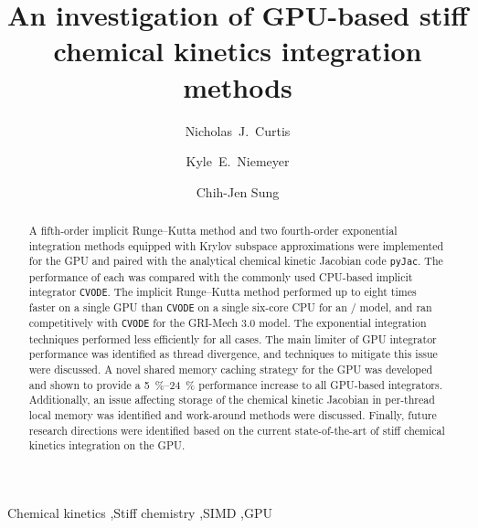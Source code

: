 \documentclass[preprint]{elsarticle}
\begin{document}
\begin{frontmatter}

\title{An investigation of GPU-based stiff chemical kinetics integration methods}

\author[uconn]{Nicholas~J.\ Curtis}
\author[osu]{Kyle~E.\ Niemeyer}
\author[uconn]{Chih-Jen Sung}

\address[uconn]{Department of Mechanical Engineering\\
  University of Connecticut, Storrs, CT, 06269, USA}
\address[osu]{School of Mechanical, Industrial, and Manufacturing Engineering\\
  Oregon State University, Corvallis, OR 97331, USA}
  

\begin{abstract}
A fifth-order implicit Runge--Kutta method and two fourth-order exponential integration methods equipped with Krylov subspace approximations were implemented for the GPU and paired with the analytical chemical kinetic Jacobian code \texttt{pyJac}.
The performance of each was compared with the commonly used CPU-based implicit integrator \texttt{CVODE}.
The implicit Runge--Kutta method performed up to eight times faster on a single GPU than \texttt{CVODE} on a single six-core CPU for an \slash {} model, and ran competitively with \texttt{CVODE} for the GRI-Mech 3.0 model.
The exponential integration techniques performed less efficiently for all cases.
The main limiter of GPU integrator performance was identified as thread divergence, and techniques to mitigate this issue were discussed.
A novel shared memory caching strategy for the GPU was developed and shown to provide a \SIrange{5}{24}{\percent} performance increase to all GPU-based integrators.
Additionally, an issue affecting storage of the chemical kinetic Jacobian in per-thread local memory was identified and work-around methods were discussed.
Finally, future research directions were identified based on the current state-of-the-art of stiff chemical kinetics integration on the GPU.
\end{abstract}

\begin{keyword}
 Chemical kinetics \sep Stiff chemistry \sep SIMD \sep GPU
\end{keyword}

\end{frontmatter}
\end{document}
